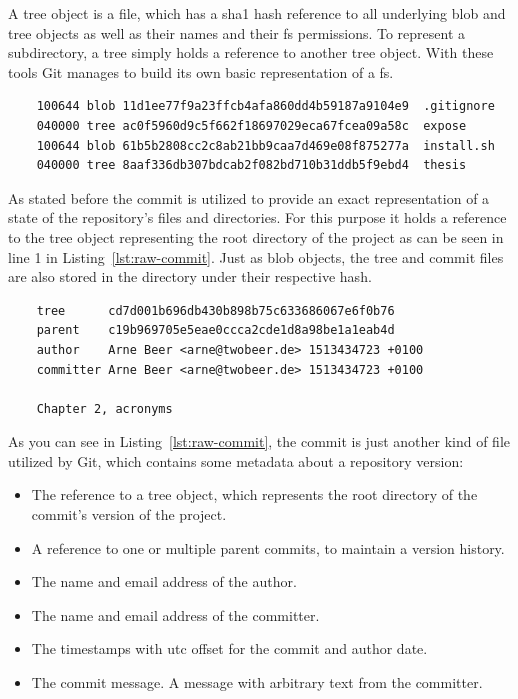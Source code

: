 A tree object is a file, which has a \ac{sha1} hash reference to all underlying blob and tree objects as well as their names and their \ac{fs} permissions.
To represent a subdirectory, a tree simply holds a reference to another tree object.
With these tools Git manages to build its own basic representation of a \ac{fs}.

\begin{verbatim}
    100644 blob 11d1ee77f9a23ffcb4afa860dd4b59187a9104e9  .gitignore
    040000 tree ac0f5960d9c5f662f18697029eca67fcea09a58c  expose
    100644 blob 61b5b2808cc2c8ab21bb9caa7d469e08f875277a  install.sh
    040000 tree 8aaf336db307bdcab2f082bd710b31ddb5f9ebd4  thesis
\end{verbatim}
\begingroup
{}
\endgroup

As stated before the commit is utilized to provide an exact representation of a state of the repository's files and directories.
For this purpose it holds a reference to the tree object representing the root directory of the project as can be seen in line 1 in Listing~\ref{lst:raw-commit}.
Just as blob objects, the tree and commit files are also stored in the  directory under their respective hash.

\begin{verbatim}
    tree      cd7d001b696db430b898b75c633686067e6f0b76
    parent    c19b969705e5eae0ccca2cde1d8a98be1a1eab4d
    author    Arne Beer <arne@twobeer.de> 1513434723 +0100
    committer Arne Beer <arne@twobeer.de> 1513434723 +0100

    Chapter 2, acronyms
\end{verbatim}
\begingroup
{}
\endgroup

As you can see in Listing~\ref{lst:raw-commit}, the commit is just another kind of file utilized by Git, which contains some metadata about a repository version:

\begin{itemize}
    \item The reference to a tree object, which represents the root directory of the commit's version of the project.
    \item A reference to one or multiple parent commits, to maintain a version history.
    \item The name and email address of the author.
    \item The name and email address of the committer.
    \item The timestamps with \ac{utc} offset for the commit and author date.
    \item The commit message. A message with arbitrary text from the committer.
\end{itemize}

